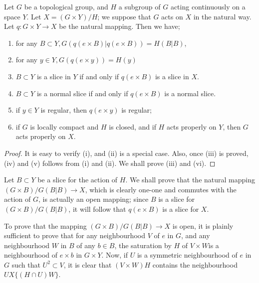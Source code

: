 \setcounter{lem}{0} 
\begin{lem}\label{chap2:lem1}%
  Let $G$ be a topological group, and $H$ a subgroup of $G$ acting
  continuously on a space $Y$. Let $X=(G \times Y)/H$; we suppose that
  $G$ acts on $X$ in the natural way. Let $q: G \times Y \to X$ be the
  natural mapping. Then we have; 
  \begin{enumerate}[\rm (i)]
  \item for any $B \subset Y, G(q(e \times B)| q (e \times B))=H(B |
    B)$,

  \item for any $y \in Y, G(q(e \times y))=H(y) $

  \item $B \subset Y$ is a slice in $Y$ if and only if $q(e \times B)$
    is a slice in $X$. 

  \item  $B \subset Y$ is a normal slice if and only if $q(e \times
    B)$ is a normal slice. 

  \item if $y \in Y$ is regular, then $q(e \times y)$ is regular;

  \item if $G$ is locally compact and $H$ is closed, and if $H$ acts
    properly on $Y$, then $G$ acts properly on $X$. 
  \end{enumerate}
\end{lem} 

\begin{proof}
  It is easy to verify (i), and (ii) is a special case. Also, once
  (iii) is proved, (iv) and (v) follows from (i) and (ii). We
  shall prove (iii) and (vi). 
\end{proof}
  
\medskip
{}
 Let $B \subset Y$ be a slice for the action of $H$. We shall prove 
  that the natural mapping $(G \times B)/ G(B | B) \to X$, which is
  clearly one-one and commutes with the action of $G$, is actually an
  open mapping; since $B$ is a slice for $(G \times B)/ G(B | B)$, it
  will follow that $q(e \times B)$ is a slice for $X$. 

To prove that the mapping $(G \times B)/G(B|B)\to X$ is open, it is
plainly sufficient to prove that for any neighbourhood $V$ of $e$ in
$G$, and any neighbourhood $W$ in $B$ of any $b \in B$, the
saturation by $H$ of $V \times W$\pageoriginale is a neighbourhood  of
$e \times b$ in $ G \times  Y $. Now, if  $U$ is a  symmetric  neighbourhood of
$e$ in $G$ such that  $ U^2  \subset V $, it is clear  that $( V
\times W )  H $ contains the neighbourhood  $ U X \{ (  H \cap U ) W
\} $.  

